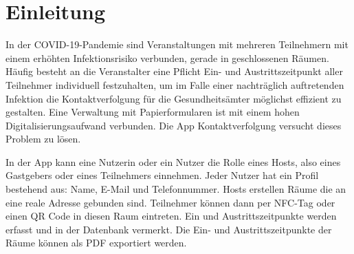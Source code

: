 \sloppy
\section{Einleitung}
\label{sec:Einleitung}
In der COVID-19-Pandemie sind Veranstaltungen mit mehreren Teilnehmern mit einem erhöhten Infektionsrisiko verbunden, gerade in geschlossenen Räumen.
Häufig besteht an die Veranstalter eine Pflicht Ein- und Austrittszeitpunkt aller Teilnehmer individuell festzuhalten, um im Falle einer nachträglich auftretenden Infektion die Kontaktverfolgung für die Gesundheitsämter möglichst effizient zu gestalten.
Eine Verwaltung mit Papierformularen ist mit einem hohen Digitalisierungsaufwand verbunden.
Die App Kontaktverfolgung versucht dieses Problem zu lösen.

In der App kann eine Nutzerin oder ein Nutzer die Rolle eines Hosts, also eines Gastgebers oder eines Teilnehmers einnehmen.
 Jeder Nutzer hat ein Profil bestehend aus: Name, E-Mail und Telefonnummer.
Hosts erstellen Räume die an eine reale Adresse gebunden sind. Teilnehmer können dann per NFC-Tag oder einen QR Code in diesen Raum eintreten. Ein und Austrittszeitpunkte werden erfasst und in der Datenbank vermerkt.
Die Ein- und Austrittszeitpunkte der Räume können als PDF exportiert werden.
